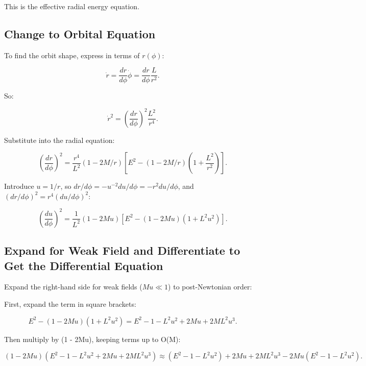 \documentclass{article}
\begin{document}
This is the effective radial energy equation.

\subsection{Change to Orbital Equation}

To find the orbit shape, express in terms of \(r(\phi)\):

\begin{equation}
 \dot{r} = \frac{dr}{d\phi} \dot{\phi} = \frac{dr}{d\phi} \frac{L}{r^2}.
\end{equation}

So:

\begin{equation}
 \dot{r}^2 = \left(\frac{dr}{d\phi}\right)^2 \frac{L^2}{r^4}.
\end{equation}

Substitute into the radial equation:

\begin{equation}
 \left(\frac{dr}{d\phi}\right)^2 = \frac{r^4}{L^2} (1 - 2M/r) \left[ E^2 - (1 - 2M/r) \left(1 + \frac{L^2}{r^2}\right) \right].
\end{equation}

Introduce \(u = 1/r\), so \( dr / d\phi = - u^{-2} du / d\phi = - r^2 du / d\phi \), and \((dr/d\phi)^2 = r^4 (du/d\phi)^2\):

\begin{equation}
 \left(\frac{du}{d\phi}\right)^2 = \frac{1}{L^2} (1 - 2Mu) \left[ E^2 - (1 - 2Mu) (1 + L^2 u^2) \right].
\end{equation}

\subsection{Expand for Weak Field and Differentiate to Get the Differential Equation}

Expand the right-hand side for weak fields (\(M u \ll 1\)) to post-Newtonian order:

First, expand the term in square brackets:

\begin{equation}
 E^2 - (1 - 2Mu) (1 + L^2 u^2) = E^2 - 1 - L^2 u^2 + 2Mu + 2M L^2 u^3.
\end{equation}

Then multiply by (1 - 2Mu), keeping terms up to O(M):

\begin{equation}
 (1 - 2Mu) (E^2 - 1 - L^2 u^2 + 2Mu + 2M L^2 u^3) \approx (E^2 - 1 - L^2 u^2) + 2Mu + 2M L^2 u^3 - 2Mu (E^2 - 1 - L^2 u^2).
\end{equation}
\end{document}
